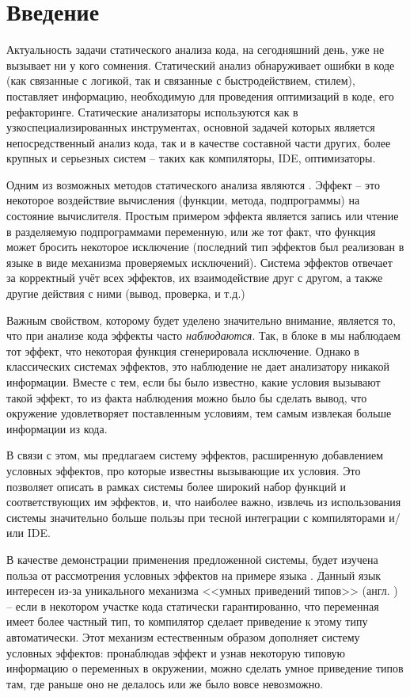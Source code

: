 \section{Введение}

Актуальность задачи статического анализа кода, на сегодняшний день, уже не вызывает ни у кого сомнения. Статический анализ обнаруживает ошибки в коде (как связанные с логикой, так и связанные с быстродействием, стилем), поставляет информацию, необходимую для проведения оптимизаций в коде, его рефакторинге. Статические анализаторы используются как в узкоспециализированных инструментах, основной задачей которых является непосредственный анализ кода, так и в качестве составной части других, более крупных и серьезных систем -- таких как компиляторы, IDE, оптимизаторы.

Одним из возможных методов статического анализа являются . Эффект -- это некоторое воздействие вычисления (функции, метода, подпрограммы) на состояние вычислителя. Простым примером эффекта является запись или чтение в разделяемую подпрограммами переменную, или же тот факт, что функция может бросить некоторое исключение (последний тип эффектов был реализован в языке  в виде механизма проверяемых исключений). Система эффектов отвечает за корректный учёт всех эффектов, их взаимодействие друг с другом, а также другие действия с ними (вывод, проверка, и т.д.)

Важным свойством, которому будет уделено значительно внимание, является то, что при анализе кода эффекты часто \textit{наблюдаются}. Так, в блоке  в  мы наблюдаем тот эффект, что некоторая функция сгенерировала исключение. Однако в классических системах эффектов, это наблюдение не дает анализатору никакой информации. Вместе с тем, если бы было известно, какие условия вызывают такой эффект, то из факта наблюдения можно было бы сделать вывод, что окружение удовлетворяет поставленным условиям, тем самым извлекая больше информации из кода. 

В связи с этом, мы предлагаем систему эффектов, расширенную добавлением условных эффектов, про которые известны вызывающие их условия. Это позволяет описать в рамках системы более широкий набор функций и соответствующих им эффектов, и, что наиболее важно, извлечь из использования системы значительно больше пользы при тесной интеграции с компиляторами и/или IDE. 

В качестве демонстрации применения предложенной системы, будет изучена польза от рассмотрения условных эффектов на примере языка . Данный язык интересен из-за уникального механизма <<умных приведений типов>> (англ. ) -- если в некотором участке кода статически гарантированно, что переменная имеет более частный тип, то компилятор сделает приведение к этому типу автоматически. Этот механизм естественным образом дополняет систему условных эффектов: пронаблюдав эффект и узнав некоторую типовую информацию о переменных в окружении, можно сделать умное приведение типов там, где раньше оно не делалось или же было вовсе невозможно. 

